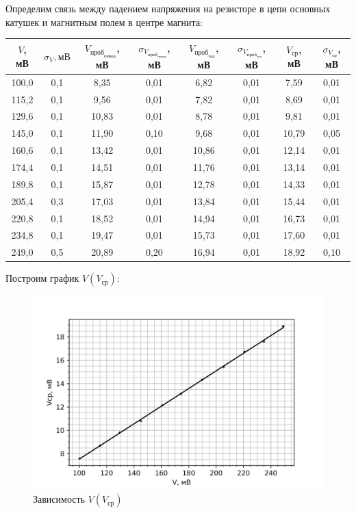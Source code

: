 \documentclass[a4paper,12pt]{report}
\begin{document}
Определим связь между падением напряжения на резисторе в цепи основных катушек и магнитным полем в центре магнита:
		
\begin{table}[H]
\begin{tabular}{|c|c|c|c|c|c|c|c|}
\hline
$V$,   мВ   & $\sigma_{V},   мВ$ & $V_{\text{проб}}_{\text{перед}}$,   мВ & $\sigma_{V_{\text{проб}}_{\text{перед}}}$,   мВ & $V_{\text{проб}}_{\text{зад}}$,   мВ  & $\sigma_{V_{\text{проб}}_{\text{зад}}}$,   мВ & $V_{\text{ср}}$,   мВ   & $\sigma_{V_{\text{ср}}}$,   мВ \\ \hline
100,0 & 0,1       & 8,35   & 0,01         & 6,82  & 0,01       & 7,59  & 0,01      \\ \hline
115,2 & 0,1       & 9,56   & 0,01         & 7,82  & 0,01       & 8,69  & 0,01      \\ \hline
129,6 & 0,1       & 10,83  & 0,01         & 8,78  & 0,01       & 9,81  & 0,01      \\ \hline
145,0 & 0,1       & 11,90  & 0,10         & 9,68  & 0,01       & 10,79 & 0,05      \\ \hline
160,6 & 0,1       & 13,42  & 0,01         & 10,86 & 0,01       & 12,14 & 0,01      \\ \hline
174,4 & 0,1       & 14,51  & 0,01         & 11,76 & 0,01       & 13,14 & 0,01      \\ \hline
189,8 & 0,1       & 15,87  & 0,01         & 12,78 & 0,01       & 14,33 & 0,01      \\ \hline
205,4 & 0,3       & 17,03  & 0,01         & 13,84 & 0,01       & 15,44 & 0,01      \\ \hline
220,8 & 0,1       & 18,52  & 0,01         & 14,94 & 0,01       & 16,73 & 0,01      \\ \hline
234,8 & 0,1       & 19,47  & 0,01         & 15,73 & 0,01       & 17,60 & 0,01      \\ \hline
249,0 & 0,5       & 20,89  & 0,20         & 16,94 & 0,01       & 18,92 & 0,10      \\ \hline
\end{tabular}
\end{table}

Построим график $V(V_{\text{ср}})$:

	\begin{figure}[H]
		\centering
		\includegraphics[width=0.7\linewidth]{V (Vср).png}
		\caption{Зависимость $V(V_{\text{ср}})$}
	\end{figure}
	
\end{document}
